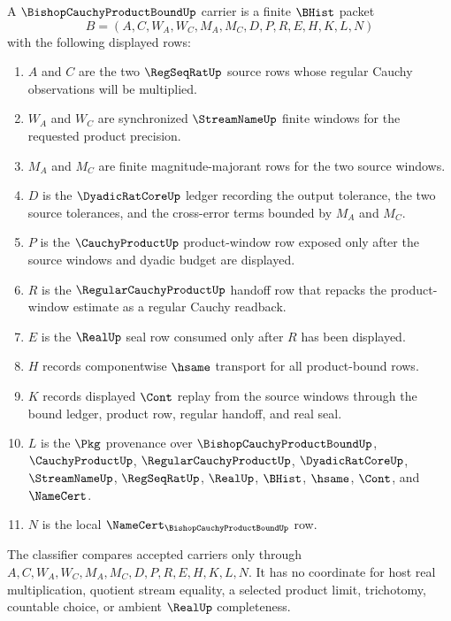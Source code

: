 \begin{definition}
\label{def:bishop-cauchy-product-bound-carrier}
A $\BishopCauchyProductBoundUp$ carrier is a finite $\BHist$ packet
$$
B=(A,C,W_A,W_C,M_A,M_C,D,P,R,E,H,K,L,N)
$$
with the following displayed rows:
\begin{enumerate}
\item $A$ and $C$ are the two $\RegSeqRatUp$ source rows whose regular Cauchy observations will be multiplied.
\item $W_A$ and $W_C$ are synchronized $\StreamNameUp$ finite windows for the requested product precision.
\item $M_A$ and $M_C$ are finite magnitude-majorant rows for the two source windows.
\item $D$ is the $\DyadicRatCoreUp$ ledger recording the output tolerance, the two source tolerances, and the cross-error terms bounded by $M_A$ and $M_C$.
\item $P$ is the $\CauchyProductUp$ product-window row exposed only after the source windows and dyadic budget are displayed.
\item $R$ is the $\RegularCauchyProductUp$ handoff row that repacks the product-window estimate as a regular Cauchy readback.
\item $E$ is the $\RealUp$ seal row consumed only after $R$ has been displayed.
\item $H$ records componentwise $\hsame$ transport for all product-bound rows.
\item $K$ records displayed $\Cont$ replay from the source windows through the bound ledger, product row, regular handoff, and real seal.
\item $L$ is the $\Pkg$ provenance over $\BishopCauchyProductBoundUp$, $\CauchyProductUp$, $\RegularCauchyProductUp$, $\DyadicRatCoreUp$, $\StreamNameUp$, $\RegSeqRatUp$, $\RealUp$, $\BHist$, $\hsame$, $\Cont$, and $\NameCert$.
\item $N$ is the local $\NameCert_{\BishopCauchyProductBoundUp}$ row.
\end{enumerate}
The classifier compares accepted carriers only through $A,C,W_A,W_C,M_A,M_C,D,P,R,E,H,K,L,N$. It has no coordinate for host real multiplication, quotient stream equality, a selected product limit, trichotomy, countable choice, or ambient $\RealUp$ completeness.
\end{definition}

